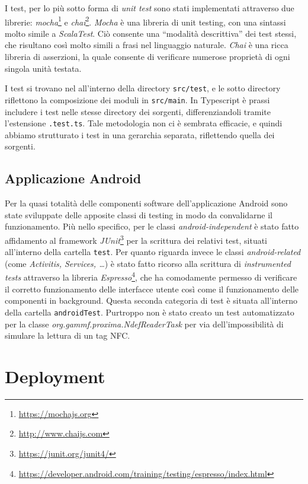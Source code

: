 \documentclass[a4paper,12pt]{report}
\begin{document}
I test, per lo più sotto forma di \emph{unit test} sono stati implementati attraverso due librerie: \emph{mocha}\footnote{\url{https://mochajs.org}} e \emph{chai}\footnote{\url{http://www.chaijs.com}}. \emph{Mocha} è una libreria di unit testing, con una sintassi molto simile a \emph{ScalaTest}. Ciò consente una ``modalità descrittiva'' dei test stessi, che risultano così molto simili a frasi nel linguaggio naturale. \emph{Chai} è una ricca libreria di asserzioni, la quale consente di verificare numerose proprietà di ogni singola unità testata. 

I test si trovano nel all'interno della directory \texttt{src/test}, e le sotto directory riflettono la composizione dei moduli in \texttt{src/main}. In Typescript è prassi includere i test nelle stesse directory dei sorgenti, differenziandoli tramite l'estensione \texttt{.test.ts}. Tale metodologia non ci è sembrata efficacie, e quindi abbiamo strutturato i test in una gerarchia separata, riflettendo quella dei sorgenti.
\section{Applicazione Android}

Per la quasi totalità delle componenti software dell'applicazione Android sono state sviluppate delle apposite classi di testing in modo da convalidarne il funzionamento. Più nello specifico, per le classi \emph{android-independent} è stato fatto affidamento al framework \emph{JUnit}\footnote{\url{https://junit.org/junit4/}} per la scrittura dei relativi test, situati all'interno della cartella \texttt{test}. Per quanto riguarda invece le classi \emph{android-related} (come \emph{Activitis, Services, \dots}) è stato fatto ricorso alla scrittura di \emph{instrumented tests} attraverso la libreria \emph{Espresso}\footnote{\url{https://developer.android.com/training/testing/espresso/index.html}}, che ha comodamente permesso di verificare il corretto funzionamento delle interfacce utente così come il funzionamento delle componenti in background. Questa seconda categoria di test è situata all'interno della cartella \texttt{androidTest}. Purtroppo non è stato creato un test automatizzato per la classe \emph{org.gammf.proxima.NdefReaderTask} per via dell'impossibilità di simulare la lettura di un tag NFC.


\chapter{Deployment} \label{deployment}
\end{document}

